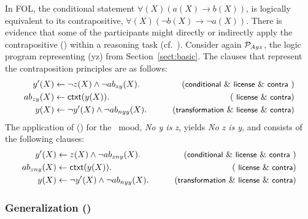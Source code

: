 \documentclass[12pt]{article}
\begin{document}
In FOL, the conditional statement $\forall (X) (a(X) \rightarrow b(X))$, is logically
equivalent to its contrapositive, $\forall (X) (\neg b(X) \rightarrow \neg a(X))$.
There is
evidence that some of the participants might directly or indirectly 
apply the contrapositive (\contraposition) within a reasoning task (cf.~\cite{rips:1994,mentallogic:1994}).
Consider again ${\cal P}_{Ayz}$, the logic program representing (\MA yz)
from Section~\ref{sect:basic}. The clauses that represent the contraposition principles are as follows:
\begin{align}
y'(X) & \leftarrow  \neg z(X) \wedge \neg \Ab_{zy}(X). & \tag{\conditionals\ \&\ \licenses\ \&\ \contraposition\ } \\
\Ab_{zy}(X) & \leftarrow \cxt(y(X)). & \tag{ \licenses\ \&\ \contraposition}\\
y(X) & \leftarrow  \neg y'(X) \wedge \neg \Ab_{nyy}(X). & \tag{\transformation\ \&\ \licenses\ \&\ \contraposition} 
\end{align}
The application of (\contraposition) for the \ME\ mood,
\textit{No y is z}, yields \textit{No z is y}, and consists of the following clauses:
\begin{align}
y'(X) & \leftarrow z(X) \wedge \neg \Ab_{zny}(X). & \tag{\conditionals\ \&\ \licenses\ \&\ \contraposition\ } \\
\Ab_{zny}(X) & \leftarrow \cxt(y(X)). &\tag{ \licenses\ \&\ \contraposition}\\
y(X) & \leftarrow \neg y'(X) \wedge \neg \Ab_{nyy}(X). & \tag{\transformation\ \&\ \licenses\ \&\ \contraposition} 
\end{align}




\subsubsection{Generalization (\negFailure)}  %
\end{document}
